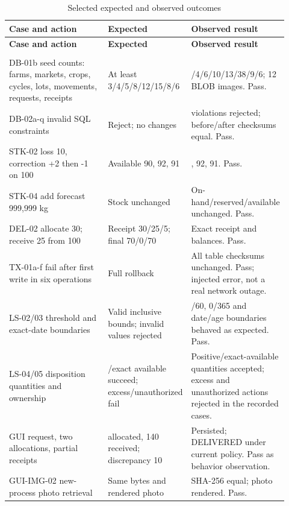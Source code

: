 \documentclass[12pt,a4paper]{report}
\begin{document}
\begingroup\small{}\setlength{\tabcolsep}{3pt}
\begin{longtable}{>{\raggedright\arraybackslash}p{0.43\linewidth}>{\raggedright\arraybackslash}p{0.24\linewidth}>{\raggedright\arraybackslash}p{0.25\linewidth}}
\caption{Selected expected and observed outcomes}\\\toprule
\textbf{Case and action} & \textbf{Expected} & \textbf{Observed result} \\ \midrule
\endfirsthead
\toprule
\textbf{Case and action} & \textbf{Expected} & \textbf{Observed result} \\ \midrule
\endhead
\midrule\multicolumn{3}{r}{\small Continued on next page}\\\endfoot
\bottomrule\endlastfoot
DB-01b seed counts: farms, markets, crops, cycles, lots, movements, requests, receipts & At least 3/\allowbreak{}4/\allowbreak{}5/\allowbreak{}8/\allowbreak{}12/\allowbreak{}15/\allowbreak{}8/\allowbreak{}6 & 4/\allowbreak{}4/\allowbreak{}6/\allowbreak{}10/\allowbreak{}13/\allowbreak{}38/\allowbreak{}9/\allowbreak{}6; 12 BLOB images. Pass. \\[4pt]
DB-02a-q invalid SQL constraints & Reject; no changes & 17 violations rejected; before/\allowbreak{}after checksums equal. Pass. \\[4pt]
STK-02 loss 10, correction +2 then -1 on 100 & Available 90, 92, 91 & 90, 92, 91. Pass. \\[4pt]
STK-04 add forecast 999,999 kg & Stock unchanged & On-hand/\allowbreak{}reserved/\allowbreak{}available unchanged. Pass. \\[4pt]
DEL-02 allocate 30; receive 25 from 100 & Receipt 30/\allowbreak{}25/\allowbreak{}5; final 70/\allowbreak{}0/\allowbreak{}70 & Exact receipt and balances. Pass. \\[4pt]
TX-01a-f fail after first write in six operations & Full rollback & All table checksums unchanged. Pass; injected error, not a real network outage. \\[4pt]
LS-02/\allowbreak{}03 threshold and exact-date boundaries & Valid inclusive bounds; invalid values rejected & 0/\allowbreak{}60, 0/\allowbreak{}365 and date/\allowbreak{}age boundaries behaved as expected. Pass. \\[4pt]
LS-04/\allowbreak{}05 disposition quantities and ownership & 0.01/\allowbreak{}exact available succeed; excess/\allowbreak{}unauthorized fail & Positive/exact-available quantities accepted; excess and unauthorized actions rejected in the recorded cases. \\[4pt]
GUI request, two allocations, partial receipts & 150 allocated, 140 received; discrepancy 10 & Persisted; DELIVERED under current policy. Pass as behavior observation. \\[4pt]
GUI-IMG-02 new-process photo retrieval & Same bytes and rendered photo & SHA-256 equal; photo rendered. Pass. \\[4pt]
\end{longtable}\endgroup
\end{document}
